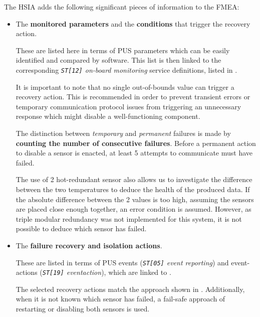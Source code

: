 \documentclass[a4paper,nobib]{tufte-book}
\begin{document}
The \ac{HSIA} adds the following significant pieces of information to the \ac{FMEA}:\autocite{ECSS-Q-ST-30-02C}
\begin{itemize}
	\item The \textbf{monitored parameters} and the \textbf{conditions} that trigger the recovery action.
	
	These are listed here in terms of \ac{PUS} parameters which can be easily identified and compared by software. This list is then linked to the corresponding \emph{\texttt{ST[12]} on-board monitoring} service definitions, listed in .
	
	It is important to note that no single out-of-bounds value can trigger a recovery action. This is recommended in order to prevent transient errors or temporary communication protocol issues from triggering an unnecessary response which might disable a well-functioning component.
	
	The distinction between \emph{temporary} and \emph{permanent} failures is made by \textbf{counting the number of consecutive failures}. Before a permanent action to disable a sensor is enacted, at least 5 attempts to communicate must have failed.
	
	The use of 2 hot-redundant sensor also allows us to investigate the difference between the two temperatures to deduce the health of the produced data. If the absolute difference between the 2 values is too high, assuming the sensors are placed close enough together, an error condition is assumed. However, as triple modular redundancy was not implemented for this system, it is not possible to deduce which sensor has failed.
	
	\item The \textbf{failure recovery and isolation actions}.
	
	These are listed in terms of \ac{PUS} events (\emph{\texttt{ST[05]} event reporting}) and event-actions (\emph{\texttt{ST[19]} eventaction}), which are linked to .
	
	The selected recovery actions match the approach shown in . Additionally, when it is not known which sensor has failed, a fail-safe approach of restarting or disabling both sensors is used.
\end{itemize}
\end{document}
